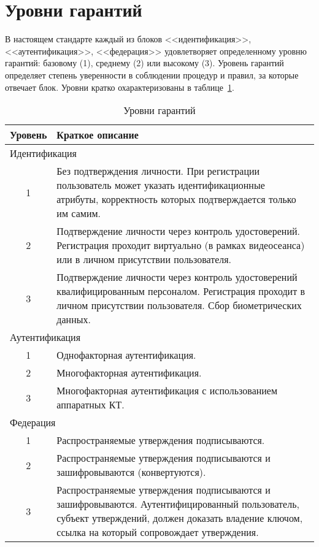 \section{Уровни гарантий}\label{COMMON.Levels}

В настоящем стандарте каждый из блоков <<идентификация>>, <<аутентификация>>, 
<<федерация>> удовлетворяет определенному уровню гарантий: базовому (1), 
среднему (2) или высокому (3).
%
Уровень гарантий определяет степень уверенности в соблюдении процедур и правил, 
за которые отвечает блок.
%
Уровни кратко охарактеризованы в таблице~\ref{Table.COMMON.AL}. 

\begin{table}[hbt]
\caption{Уровни гарантий}\label{Table.COMMON.AL}
\begin{tabular}{|c|p{14cm}|}
\hline
Уровень & Краткое описание\\
\hline
\hline
\multicolumn{2}{|l|}{Идентификация}\\
\hline
\hline
%
1 & Без подтверждения личности. При регистрации пользователь может
указать идентификационные атрибуты, корректность которых подтверждается 
только им самим.\\ 
\hline
%
2 & Подтверждение личности через контроль удостоверений.
Регистрация проходит виртуально (в рамках видеосеанса) или в личном присутствии 
пользователя.\\
\hline
%
3 & Подтверждение личности через контроль удостоверений квалифицированным 
персоналом. Регистрация проходит в личном присутствии пользователя.
Сбор биометрических данных.\\
%
\hline
\hline
\multicolumn{2}{|l|}{Аутентификация}\\
\hline
\hline
%
1 & Однофакторная аутентификация.\\
\hline
%
2 & Многофакторная аутентификация.\\
\hline
%
3 & Многофакторная аутентификация с использованием аппаратных КТ.\\
%
\hline
\hline
\multicolumn{2}{|l|}{Федерация}\\
\hline
\hline
%
1 & Распространяемые утверждения подписываются.\\
\hline
%
2 & Распространяемые утверждения подписываются и зашифровываются 
(конвертуются).\\
\hline
%
3 & Распространяемые утверждения подписываются и зашифровываются.
Аутентифицированный пользователь, субъект утверждений, должен доказать владение 
ключом, ссылка на который сопровождает утверждения.\\ 
\hline
\end{tabular}
\end{table}

